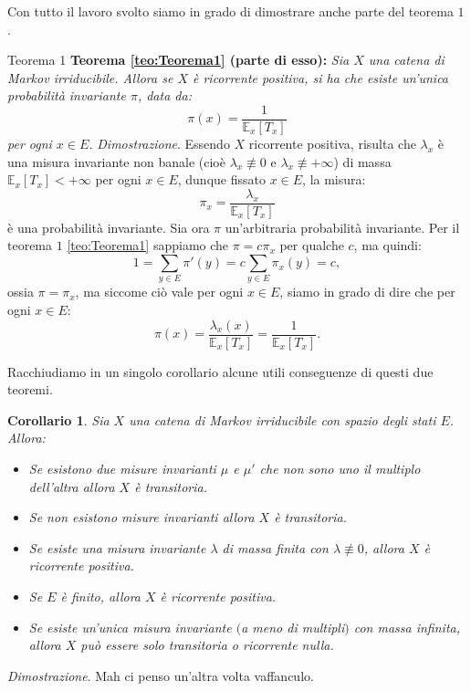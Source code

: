 \documentclass[11pt]{book}
\makeatletter
\theoremstyle{Definizione}
\theoremstyle{TeoremaProposizioneLemmaCorollario}
\newtheorem{mycor}[myteo]{Corollario}
\theoremstyle{OsservazioneNota}
\renewenvironment{proof}[1][\proofname]{\par
  \normalfont \topsep6\p@\@plus6\p@\relax
  \trivlist
  \item[\hskip\labelsep
        \itshape
    #1\@addpunct{.}]\ignorespaces
}{%
  \endtrivlist\@endpefalse
}
\newcommand{\E}{\mathbb{E}}
\renewenvironment{proof}{\textsl{Dimostrazione}.}{}
\makeatother
\begin{document}
\noindent
Con tutto il lavoro svolto siamo in grado di dimostrare anche parte del teorema $1$.
\begin{boxteo}{Teorema 1}
\textbf{Teorema \ref{teo:Teorema1} (parte di esso):}\textsl{ Sia $X$ una catena di Markov irriducibile. Allora se $X$ è ricorrente positiva, si ha che esiste un'unica probabilità invariante $\pi$, data da:}
$$
\pi(x) = \frac{1}{\E_x[T_x]}
$$
\textsl{per ogni $x\in E$.}
\tcblower
\begin{proof}
Essendo $X$ ricorrente positiva, risulta che $\lambda_x$ è una misura invariante non banale (cioè $\lambda_x \not \equiv 0$ e $\lambda_x \not \equiv +\infty$) di massa $\E_x[T_x]<+\infty$ per ogni $x\in E$, dunque fissato $x\in E$, la misura:
$$
\pi_x = \frac{\lambda_x}{\E_x[T_x]}
$$
è una probabilità invariante. Sia ora $\pi$ un'arbitraria probabilità invariante. Per il teorema $1$ \ref{teo:Teorema1} sappiamo che $\pi = c \pi_x$ per qualche $c$, ma quindi:
$$
1 = \sum_{y\in E} \pi'(y) = c \sum_{y\in E} \pi_x(y) = c,
$$
ossia $\pi = \pi_x$, ma siccome ciò vale per ogni $x\in E$, siamo in grado di dire che per ogni $x\in E$:
$$
\pi(x) = \frac{\lambda_x(x)}{\E_x[T_x]} = \frac{1}{\E_x[T_x]}.
$$
\end{proof}
\end{boxteo}
\noindent
Racchiudiamo in un singolo corollario alcune utili conseguenze di questi due teoremi.
\begin{boxoss}
\begin{mycor}
Sia $X$ una catena di Markov irriducibile con spazio degli stati $E$. Allora:
\begin{itemize}
\item[$(i)$] Se esistono due  misure invarianti $\mu$ e $\mu'$ che non sono uno il multiplo dell'altra allora $X$ è transitoria.
\item[$(ii)$] Se non esistono misure invarianti allora $X$ è transitoria.
\item[$(iii)$] Se esiste una misura invariante $\lambda$ di massa finita con $\lambda \not \equiv 0$, allora $X$ è ricorrente positiva.
\item[$(iv)$] Se $E$ è finito, allora $X$ è ricorrente positiva.
\item[$(v)$] Se esiste un'unica misura invariante $($a meno di multipli$)$ con massa infinita, allora $X$ può essere solo transitoria o ricorrente nulla.
\end{itemize}
\end{mycor}
\tcblower
\begin{proof}
Mah ci penso un'altra volta vaffanculo.
\end{proof}
\end{boxoss}
\end{document}
